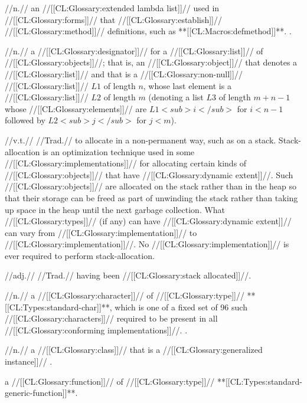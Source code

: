  //n.// an //[[CL:Glossary:extended lambda list]]// used in //[[CL:Glossary:forms]]// that //[[CL:Glossary:establish]]// //[[CL:Glossary:method]]// definitions, such as **[[CL:Macros:defmethod]]**. \Seesection\SpecializedLambdaLists.

 //n.// a //[[CL:Glossary:designator]]// for a //[[CL:Glossary:list]]// of //[[CL:Glossary:objects]]//; that is, an //[[CL:Glossary:object]]// that denotes a //[[CL:Glossary:list]]// and that is a //[[CL:Glossary:non-null]]// //[[CL:Glossary:list]]// $L1$ of length $n$, whose last element is a //[[CL:Glossary:list]]// $L2$ of length $m$ (denoting a list $L3$ of length $m+n-1$ whose //[[CL:Glossary:elements]]// are $L1<sub>i</sub>$ for $i < n-1$ followed by $L2<sub>j</sub>$ for $j < m$). 

 //v.t.// //Trad.// to allocate in a non-permanent way, such as on a stack. Stack-allocation is an optimization technique used in some //[[CL:Glossary:implementations]]// for allocating certain kinds of //[[CL:Glossary:objects]]// that have //[[CL:Glossary:dynamic extent]]//. Such //[[CL:Glossary:objects]]// are allocated on the stack rather than in the heap so that their storage can be freed as part of unwinding the stack rather than taking up space in the heap until the next garbage collection. What //[[CL:Glossary:types]]// (if any) can have //[[CL:Glossary:dynamic extent]]// can vary from //[[CL:Glossary:implementation]]// to //[[CL:Glossary:implementation]]//. No //[[CL:Glossary:implementation]]// is ever required to perform stack-allocation.

 //adj.// //Trad.// having been //[[CL:Glossary:stack allocated]]//.

 //n.// a //[[CL:Glossary:character]]// of //[[CL:Glossary:type]]// **[[CL:Types:standard-char]]**, which is one of a fixed set of 96 such //[[CL:Glossary:characters]]// required to be present in all //[[CL:Glossary:conforming implementations]]//. \Seesection\StandardChars.


 //n.// a //[[CL:Glossary:class]]// that is a //[[CL:Glossary:generalized instance]]// .

 a //[[CL:Glossary:function]]// of //[[CL:Glossary:type]]// **[[CL:Types:standard-generic-function]]**.

